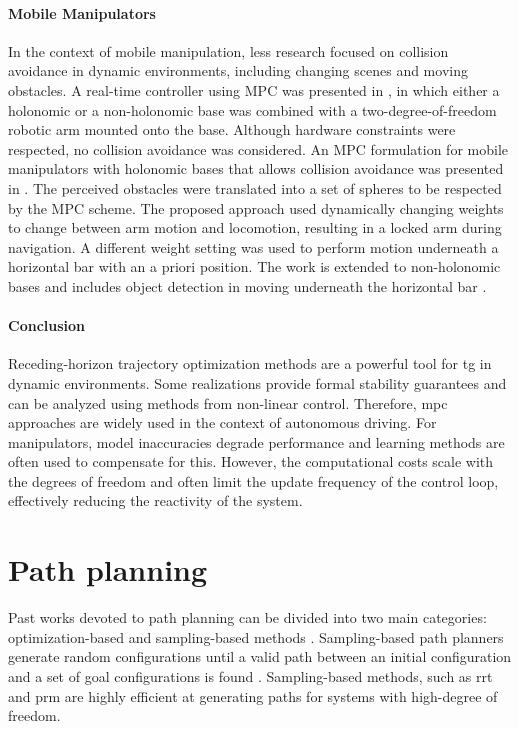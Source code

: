 \paragraph{Mobile Manipulators}

In the context of mobile manipulation, less research focused on collision
avoidance in dynamic environments, including changing scenes and moving
obstacles. A real-time controller using MPC was presented in \cite{Ide2011}, in
which either a holonomic or a non\hyp{}holonomic base was combined with a
two-degree-of-freedom robotic arm mounted onto the base. Although hardware
constraints were respected, no collision avoidance was considered.  An MPC
formulation for mobile manipulators with holonomic bases that allows collision
avoidance was presented in \cite{Avanzini2015}. The perceived obstacles were
translated into a set of spheres to be respected by the MPC scheme. The proposed
approach used dynamically changing weights to change between arm motion and
locomotion, resulting in a locked arm during navigation. A different weight
setting was used to perform motion underneath a horizontal bar with an a priori
position. The work is extended to non\hyp{}holonomic bases and includes object
detection in moving underneath the horizontal bar \cite{Avanzini2018}. 


\paragraph{Conclusion}

Receding-horizon trajectory optimization methods are a
powerful tool for \ac{tg} in dynamic environments.
Some realizations provide formal stability guarantees and can be analyzed
using methods from non-linear control. Therefore, \ac{mpc}
approaches are widely used in the context of autonomous
driving. For manipulators, model inaccuracies degrade
performance and learning methods are often used to
compensate for this. However, the computational costs scale
with the degrees of freedom and
often limit the update frequency of the control loop,
effectively reducing the reactivity of the system.

\section{Path planning}
\label{sec:path_planning}

Past works devoted to path planning can be divided into two
main categories: optimization-based and sampling-based
methods \cite{LaValle2006,Mukadam2017}. Sampling-based path
planners generate random configurations until a valid path
between an initial configuration and a set of goal
configurations is found \cite{Karaman2011}. Sampling-based
methods, such as \acf{rrt}
\cite{Webb2013,Kleinbort2019,Kuffner2000} and \acf{prm}
\cite{Hsu2002,Faust2017} are highly
efficient at generating paths for systems with high-degree
of freedom.

